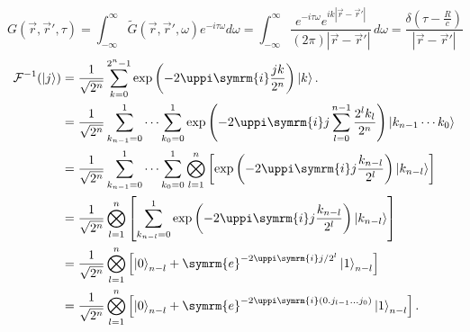 \documentclass[11pt,fleqn]{article}
\def\ee{\symrm{e}}
\def\ii{\symrm{i}}
\newcommand{\ket}[1]{\left\lvert{#1}\right\rangle}
\begin{document}
\[G(\vec{r},{\vec{r}}',\tau )=\int _{-\infty }^{\infty }\tilde{G}(\vec{r},{\vec{r}}',\omega )e^{-i \tau  \omega }d\omega=\int_{-\infty }^{\infty } \frac{e^{-i \tau  \omega } e^{i k |\vec{r}-{\vec{r}}'| }}{(2 \pi ) |\vec{r}-{\vec{r}}'| } \, d\omega=\frac{\delta  \left(\tau -\frac{R}{c}\right)}{|\vec{r}-{\vec{r}}'| }\]
\[
\begin{split}	
\mathcal{F}^{-1}(\ket{j})
&{}=\frac{1}{\sqrt{2^n}}\sum_{k=0}^{2^n-1}\exp\left(-2\uppi \ii \frac{jk}{2^n}\right)\ket{k}.\\
&{}=\frac{1}{\sqrt{2^n}}\sum_{k_{n-1}=0}^1\cdots\sum_{k_{0}=0}^1\exp\left(-2\uppi \ii j\sum_{l=0}^{n-1}\frac{2^l k_l}{2^n}\right)\ket{k_{n-1}\cdots k_0}\\
&{}=\frac{1}{\sqrt{2^n}}\sum_{k_{n-1}=0}^1\cdots\sum_{k_{0}=0}^1\bigotimes_{l=1}^n\left[\exp\left(-2\uppi \ii j\frac{k_{n-l}}{2^l}\right)\ket{k_{n-l}}\right]\\
&{}=\frac{1}{\sqrt{2^n}}\bigotimes_{l=1}^n\left[\sum_{k_{n-l}=0}^1\exp\left(-2\uppi \ii j\frac{k_{n-l}}{2^l}\right)\ket{k_{n-l}}\right]\\
&{}=\frac{1}{\sqrt{2^n}}\bigotimes_{l=1}^n\left[\ket{0}_{n-l}+\ee^{-2\uppi \ii j /2^l}\ket{1}_{n-l}\right]\\
&{}=\frac{1}{\sqrt{2^n}}\bigotimes_{l=1}^n\left[\ket{0}_{n-l}+\ee^{-2\uppi \ii ({0.j_{l-1}\ldots j_0})}\ket{1}_{n-l}\right].
\end{split}
\]

\newcommand{\lb}{\left(}
\newcommand{\rb}{\right)}
\newcommand{\ec}{\text{,}}
\newcommand{\ed}{\text{.}}
\newcommand{\bt}{\lb t\rb}
\newcommand{\deltaup}{\updelta}
\newcommand{\piup}{\uppi}
\newcommand{\ndd}{\,\mathrm{d}}
\end{document}
